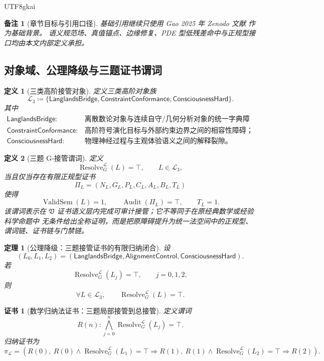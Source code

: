 \documentclass[12pt]{article}
\newtheorem{definition}{定义}[section]
\newtheorem{theorem}{定理}[section]
\newtheorem{remark}{备注}[section]
\newtheorem{Certificate}{证书}[section]
\newcommand{\Vsys}{\mathfrak V}
\newcommand{\DefEq}{\coloneqq}
\DeclareMathOperator{\Audit}{Audit}
\DeclareMathOperator{\Resolve}{Resolve}
\DeclareMathOperator{\ValidSem}{ValidSem}
\begin{document}
\begin{CJK*}{UTF8}{gkai}
\begin{remark}[章节目标与引用口径]
基础引用继续只使用 Gao 2025 年 Zenodo 文献 \cite{Gao2025PureMathZenodo} 作为基础背景。
语义规范场、真值锚点、边缘修复、PDE 型低残差命中与正规型接口均由本文内部定义承担。
\end{remark}

\subsection{对象域、公理降级与三题证书谓词}
\label{subsec:tex59-lac-objects}

\begin{definition}[三类高阶接管对象]
\label{def:tex59-lac-objects}
定义三类高阶对象族
\[
  \mathcal L_3
  \DefEq
  \{
  \mathsf{LanglandsBridge},
  \mathsf{ConstraintConformance},
  \mathsf{ConsciousnessHard}
  \}.
\]
其中
\[
\begin{array}{ll}
  \mathsf{LanglandsBridge}:& \text{离散数论对象与连续自守/几何分析对象的统一字典障碍；}\\
  \mathsf{ConstraintConformance}:& \text{高阶符号演化目标与外部约束边界之间的相容性障碍；}\\
  \mathsf{ConsciousnessHard}:& \text{物理神经过程与主观体验语义之间的解释裂隙。}
\end{array}
\]
\end{definition}

\begin{definition}[三题 G-接管谓词]
\label{def:tex59-lac-resolution}
定义
\[
  \Resolve_G^{\mathcal L}(L)=\top,
  \qquad L\in\mathcal L_3,
\]
当且仅当存在有限正规型证书
\[
  \Pi_L=(N_L,G_L,P_L,C_L,A_L,B_L,T_L)
\]
使得
\[
  \ValidSem(L)=1,
  \qquad
  \Audit(\Pi_L)=\top,
  \qquad
  T_L=1.
\]
该谓词表示在 \(\Vsys\) 证书语义层内完成可审计接管；它不等同于在原经典数学或经验科学命题中
无条件给出全称证明，而是把原障碍提升为统一法空间中的正规型、谓词链、证书链与门禁链。
\end{definition}

\begin{theorem}[公理降级：三题接管证书的有限归纳闭合]
\label{thm:tex59-lac-induction}
设
\[
  (L_0,L_1,L_2)
  =
  (
  \mathsf{LanglandsBridge},
  \mathsf{AlignmentControl},
  \mathsf{ConsciousnessHard}
  ).
\]
若
\[
  \Resolve_G^{\mathcal L}(L_j)=\top,
  \qquad j=0,1,2,
\]
则
\[
  \forall L\in\mathcal L_3,\qquad
  \Resolve_G^{\mathcal L}(L)=\top.
\]
\end{theorem}

\begin{Certificate}[数学归纳法证书：三题局部接管到总接管]
\label{cert:tex59-lac-induction}
定义谓词
\[
  R(n):
  \bigwedge_{j=0}^{n}
  \Resolve_G^{\mathcal L}(L_j)=\top.
\]
归纳证书为
\[
  \pi_{\mathcal L}
  =
  \left(
  R(0),\
  R(0)\wedge\Resolve_G^{\mathcal L}(L_1)=\top\Rightarrow R(1),\
  R(1)\wedge\Resolve_G^{\mathcal L}(L_2)=\top\Rightarrow R(2)
  \right).
\]
\end{Certificate}


\end{CJK*}
\end{document}
